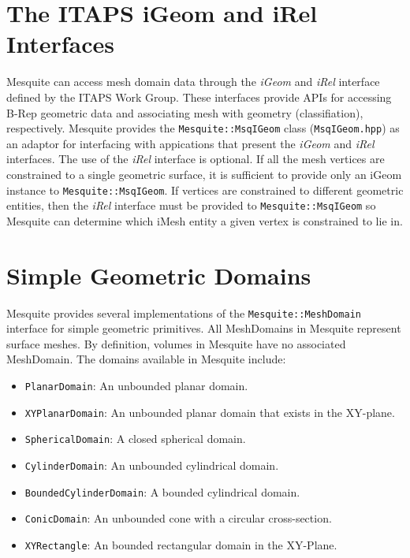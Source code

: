 \section{The ITAPS iGeom and iRel Interfaces} \label{sec:ITAPS}

Mesquite can access mesh domain data through the \emph{iGeom} and \emph{iRel} interface defined by the ITAPS Work Group.  These interfaces provide APIs for accessing B-Rep geometric data and associating mesh with geometry (classifiation), respectively.  Mesquite provides the \texttt{Mesquite::MsqIGeom} class (\texttt{MsqIGeom.hpp}) as an adaptor for interfacing with appications that present the \emph{iGeom} and \emph{iRel} interfaces.  The use of the \emph{iRel} interface is optional.  If all the mesh vertices are constrained to a single geometric surface, it is sufficient to provide only an iGeom instance to \texttt{Mesquite::MsqIGeom}.  If vertices are constrained to different geometric entities, then the \emph{iRel} interface must be provided to \texttt{Mesquite::MsqIGeom} so Mesquite can determine which iMesh entity a given vertex is constrained to lie in.


\section{Simple Geometric Domains} \label{sec:MsqGeom}

Mesquite provides several implementations of the
\texttt{Mesquite::MeshDomain} interface for simple geometric primitives. All MeshDomains in Mesquite represent surface meshes. By definition, volumes in Mesquite have no associated MeshDomain.  The domains available in Mesquite include:
\begin{itemize}
\item \texttt{PlanarDomain}: An unbounded planar domain.
\item \texttt{XYPlanarDomain}: An unbounded planar domain that exists in the XY-plane.
\item \texttt{SphericalDomain}: A closed spherical domain.
\item \texttt{CylinderDomain}: An unbounded cylindrical domain.
\item \texttt{BoundedCylinderDomain}: A bounded cylindrical domain.
\item \texttt{ConicDomain}: An unbounded cone with a circular cross-section.
\item \texttt{XYRectangle}: An bounded rectangular domain in the XY-Plane.
\end{itemize}

